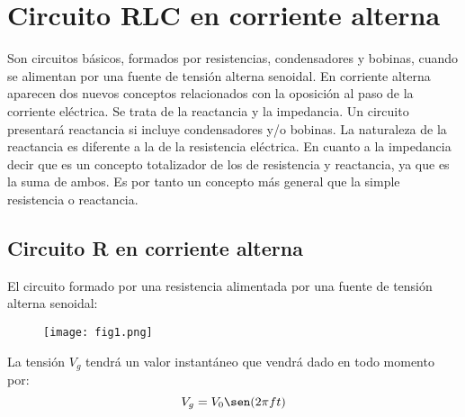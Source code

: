 \documentclass[a4paper,12pt]{report}
\begin{document}
\chapter{Circuito RLC en corriente alterna}
Son circuitos básicos, formados por resistencias, condensadores y bobinas, cuando se alimentan por una fuente de tensión alterna senoidal. En corriente alterna aparecen dos nuevos conceptos relacionados con la oposición al paso de la corriente eléctrica. Se trata de la reactancia y la impedancia. Un circuito presentará reactancia si incluye condensadores y/o bobinas. La naturaleza de la reactancia es diferente a la de la resistencia eléctrica. En cuanto a la impedancia decir que es un concepto totalizador de los de resistencia y reactancia, ya que es la suma de ambos. Es por tanto un concepto más general que la simple resistencia o reactancia.
\section{Circuito R en corriente alterna}
El circuito formado por una resistencia alimentada por una fuente de tensión alterna senoidal:
\begin{figure}[H]
\centering
\texttt{[image: fig1.png]}
\end{figure}
La tensión $V_{g}$ tendrá un valor instantáneo que vendrá dado en todo momento por:
$$
V_{g} = V_{0}\sen(2\pi f t)
$$
\end{document}
